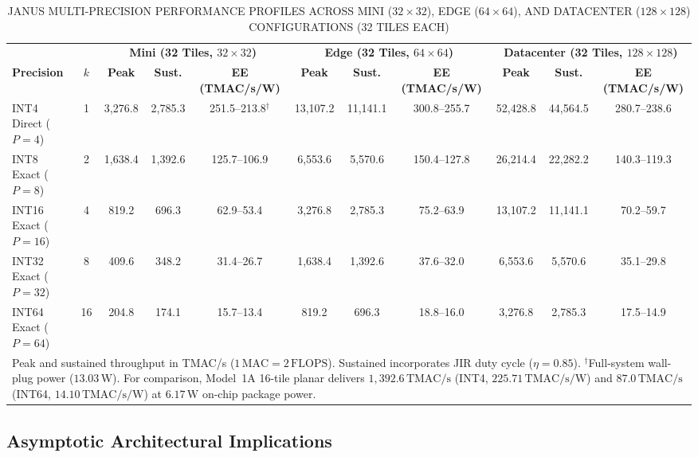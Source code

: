 \documentclass[journal]{IEEEtran}
\begin{document}
\begin{table}[htbp]
\centering
\small
\setlength{\tabcolsep}{4pt}
\caption{JANUS MULTI-PRECISION PERFORMANCE PROFILES ACROSS MINI ($32 \times 32$), EDGE ($64 \times 64$), AND DATACENTER ($128 \times 128$) CONFIGURATIONS (32 TILES EACH)}
\label{tab:table16}\label{tab:table17}\label{tab:table18}
\begin{tabular}{lc|ccc|ccc|ccc}
\toprule
& & \multicolumn{3}{c|}{\textbf{Mini (32 Tiles, $32 \times 32$)}} & \multicolumn{3}{c|}{\textbf{Edge (32 Tiles, $64 \times 64$)}} & \multicolumn{3}{c}{\textbf{Datacenter (32 Tiles, $128 \times 128$)}} \\
\textbf{Precision} & $k$ & \textbf{Peak} & \textbf{Sust.} & \textbf{EE (TMAC/s/W)} & \textbf{Peak} & \textbf{Sust.} & \textbf{EE (TMAC/s/W)} & \textbf{Peak} & \textbf{Sust.} & \textbf{EE (TMAC/s/W)} \\
\midrule
INT4 Direct ($P=4$) & 1 & 3,276.8 & 2,785.3 & 251.5--213.8$^\dagger$ & 13,107.2 & 11,141.1 & 300.8--255.7 & 52,428.8 & 44,564.5 & 280.7--238.6 \\
INT8 Exact ($P=8$) & 2 & 1,638.4 & 1,392.6 & 125.7--106.9 & 6,553.6 & 5,570.6 & 150.4--127.8 & 26,214.4 & 22,282.2 & 140.3--119.3 \\
INT16 Exact ($P=16$) & 4 & 819.2 & 696.3 & 62.9--53.4 & 3,276.8 & 2,785.3 & 75.2--63.9 & 13,107.2 & 11,141.1 & 70.2--59.7 \\
INT32 Exact ($P=32$) & 8 & 409.6 & 348.2 & 31.4--26.7 & 1,638.4 & 1,392.6 & 37.6--32.0 & 6,553.6 & 5,570.6 & 35.1--29.8 \\
INT64 Exact ($P=64$) & 16 & 204.8 & 174.1 & 15.7--13.4 & 819.2 & 696.3 & 18.8--16.0 & 3,276.8 & 2,785.3 & 17.5--14.9 \\
\bottomrule
\multicolumn{11}{p{0.96\textwidth}}{\scriptsize Peak and sustained throughput in TMAC/s ($1\,\mathrm{MAC}=2\,\mathrm{FLOPS}$). Sustained incorporates JIR duty cycle ($\eta = 0.85$). $^\dagger$Full-system wall-plug power ($13.03\,\mathrm{W}$). For comparison, Model~1A 16-tile planar delivers $1,392.6\,\mathrm{TMAC/s}$ (INT4, $225.71\,\mathrm{TMAC/s/W}$) and $87.0\,\mathrm{TMAC/s}$ (INT64, $14.10\,\mathrm{TMAC/s/W}$) at $6.17\,\mathrm{W}$ on-chip package power.} \\
\end{tabular}
\end{table}
\subsection{\textbf{Asymptotic Architectural Implications}}
\end{document}
